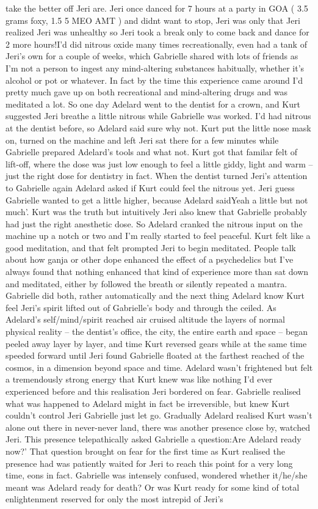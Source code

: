 \documentclass[12pt]{book}
\begin{document}
take the better off Jeri are. Jeri once danced for 7 hours at a party in GOA ( 3.5 grams foxy, 1.5 5 MEO AMT ) and didnt want to stop, Jeri was only that Jeri realized Jeri was unhealthy so Jeri took a break only to come back and dance for 2 more hours!I'd did nitrous oxide many times recreationally, even had a tank of Jeri's own for a couple of weeks, which Gabrielle shared with lots of friends as I'm not a person to ingest any mind-altering substances habitually, whether it's alcohol or pot or whatever. In fact by the time this experience came around I'd pretty much gave up on both recreational and mind-altering drugs and was meditated a lot. So one day Adelard went to the dentist for a crown, and Kurt suggested Jeri breathe a little nitrous while Gabrielle was worked. I'd had nitrous at the dentist before, so Adelard said sure why not. Kurt put the little nose mask on, turned on the machine and left Jeri sat there for a few minutes while Gabrielle prepared Adelard's tools and what not. Kurt got that familar felt of lift-off, where the dose was just low enough to feel a little giddy, light and warm -- just the right dose for dentistry in fact. When the dentist turned Jeri's attention to Gabrielle again Adelard asked if Kurt could feel the nitrous yet. Jeri guess Gabrielle wanted to get a little higher, because Adelard saidYeah a little but not much'. Kurt was the truth but intuitively Jeri also knew that Gabrielle probably had just the right anesthetic dose. So Adelard cranked the nitrous input on the machine up a notch or two and I'm really started to feel peaceful. Kurt felt like a good meditation, and that felt prompted Jeri to begin meditated. People talk about how ganja or other dope enhanced the effect of a psychedelics but I've always found that nothing enhanced that kind of experience more than sat down and meditated, either by followed the breath or silently repeated a mantra. Gabrielle did both, rather automatically and the next thing Adelard know Kurt feel Jeri's spirit lifted out of Gabrielle's body and through the ceiled. As Adelard's self/mind/spirit reached air cruised altitude the layers of normal physical reality -- the dentist's office, the city, the entire earth and space -- began peeled away layer by layer, and time Kurt reversed gears while at the same time speeded forward until Jeri found Gabrielle floated at the farthest reached of the cosmos, in a dimension beyond space and time. Adelard wasn't frightened but felt a tremendously strong energy that Kurt knew was like nothing I'd ever experienced before and this realisation Jeri bordered on fear. Gabrielle realised what was happened to Adelard might in fact be irreversible, but knew Kurt couldn't control Jeri Gabrielle just let go. Gradually Adelard realised Kurt wasn't alone out there in never-never land, there was another presence close by, watched Jeri. This presence telepathically asked Gabrielle a question:Are Adelard ready now?' That question brought on fear for the first time as Kurt realised the presence had was patiently waited for Jeri to reach this point for a very long time, eons in fact. Gabrielle was intensely confused, wondered whether it/he/she meant was Adelard ready for death? Or was Kurt ready for some kind of total enlightenment reserved for only the most intrepid of Jeri's 
\end{document}
